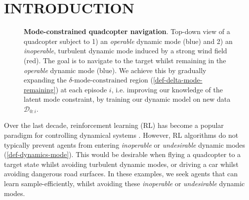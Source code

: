 \documentclass[twoside]{article}
\begin{document}
\section{INTRODUCTION}
\label{sec:org3710e1d}
\begin{figure}[!t]
  \centering
    \caption{\textbf{Mode-constrained quadcopter navigation}.
    Top-down view of a quadcopter subject to
    1) an \textit{operable} dynamic mode (blue) and 2) an \textit{inoperable}, turbulent dynamic mode induced by a strong wind field (red).
    The goal is to navigate to the target whilst remaining in the \textit{operable} dynamic mode (blue).
    We achieve this by gradually expanding the $\delta\text{-mode-constrained}$ region (\cref{def-delta-mode-remaining}) at each episode $i$,
    i.e. improving our knowledge of the latent mode constraint, by training our dynamic model on new data $\mathcal{D}_{0:i}$.}
  \label{fig-constraint-expanding}
\end{figure}
Over the last decade, reinforcement learning (RL) has become a popular paradigm for controlling dynamical systems \citep{sutton2018reinforcement,hewingLearningBased2020}.
However, RL algorithms do not typically prevent agents from entering \textit{inoperable} or \textit{undesirable} dynamic modes (\cref{def-dynamics-mode}).
This would be desirable when flying a quadcopter to a target state whilst avoiding turbulent dynamic modes,
or driving a car whilst avoiding dangerous road surfaces.
In these examples, we seek agents that can learn sample-efficiently, whilst avoiding these \textit{inoperable} or \textit{undesirable} dynamic modes.
\end{document}
